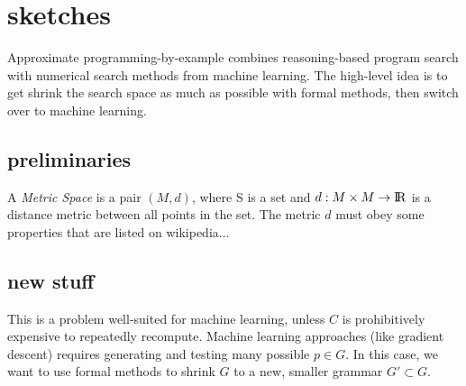 \section{sketches}

Approximate programming-by-example combines reasoning-based program search with numerical search methods from machine learning.
The high-level idea is to get shrink the search space as much as possible with formal methods, then switch over to machine learning.


\subsection{preliminaries}
A \textit{Metric Space} is a pair $(M,d)$, where S is a set and $d:M \times M \to {\rm I\!R}$ is a distance metric between all points in the set. The metric $d$ must obey some properties that are listed on wikipedia...

\iffalse
I think I dont need this actually
A product metric $(X^{*},d_p)$ is a metric space over the Cartesian product of finitely many metric spaces $(X_0,d_0),...,(X_n,d_n)$,
  where $d_p:X^n \times X^n \to \reals$ also obey those properties.
If $d_p$ is a norm ``which is non-decreasing as the coordinates of a positive n-tuple increase``\footnote{took this from \url{https://en.wikipedia.org/wiki/Metric_space#Product_metric_spaces}, not sure how to formalize it yet}, then then topology of the X^* is equivelant
\fi

\subsection{new stuff}

This is a problem well-suited for machine learning, unless $C$ is prohibitively expensive to repeatedly recompute.
Machine learning approaches (like gradient descent) requires generating and testing many possible $p \in G$.
In this case, we want to use formal methods to shrink $G$ to a new, smaller grammar $G' \subset G$.

